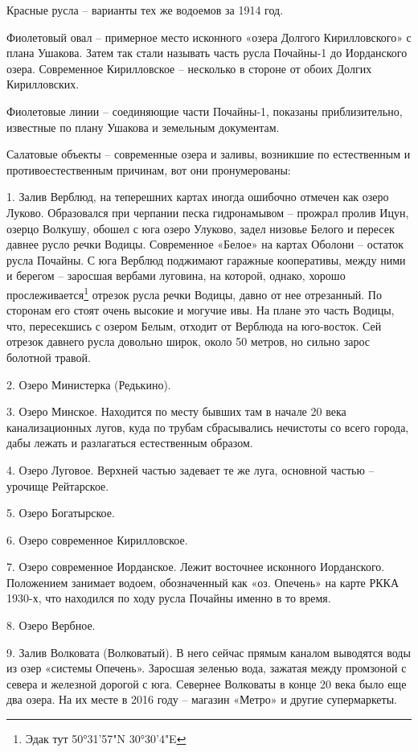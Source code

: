 Красные русла – варианты тех же водоемов за 1914 год.

Фиолетовый овал – примерное место исконного «озера Долгого Кирилловского» с плана Ушакова. Затем так стали называть часть русла Почайны-1 до Иорданского озера. Современное Кирилловское – несколько в стороне от обоих Долгих Кирилловских.

Фиолетовые линии – соединяющие части Почайны-1, показаны приблизительно, известные по плану Ушакова и земельным документам.

Салатовые объекты – современные озера и заливы, возникшие по естественным и противоестественным причинам, вот они пронумерованы:

1. Залив Верблюд, на теперешних картах иногда ошибочно отмечен как озеро Луково. Образовался при черпании песка гидронамывом – прожрал пролив Ицун, озерцо Волкушу, обошел с юга озеро Улуково, задел низовье Белого и пересек давнее русло речки Водицы. Современное «Белое» на картах Оболони – остаток русла Почайны. С юга Верблюд поджимают гаражные кооперативы, между ними и берегом – заросшая вербами луговина, на которой, однако, хорошо прослеживается\footnote{Эдак тут 50°31'57"N 30°30'4"E} отрезок русла речки Водицы, давно от нее отрезанный. По сторонам его стоят очень высокие и могучие ивы. На плане это часть Водицы, что, пересекшись с озером Белым, отходит от Верблюда на юго-восток. Сей отрезок давнего русла довольно широк, около 50 метров, но сильно зарос болотной травой.

2. Озеро Министерка (Редькино).

3. Озеро Минское. Находится по месту бывших там в начале 20 века канализационных лугов, куда по трубам сбрасывались нечистоты со всего города, дабы лежать и разлагаться естественным образом.

4. Озеро Луговое. Верхней частью задевает те же луга, основной частью – урочище Рейтарское.

5. Озеро Богатырское.

6. Озеро современное Кирилловское.

7. Озеро современное Иорданское. Лежит восточнее исконного Иорданского. Положением занимает водоем, обозначенный как «оз. Опечень» на карте РККА 1930-х, что находился по ходу русла Почайны именно в то время.

8. Озеро Вербное.

9. Залив Волковата (Волковатый). В него сейчас прямым каналом выводятся воды из озер «системы Опечень». Заросшая зеленью вода, зажатая между промзоной с севера и железной дорогой с юга. Севернее Волковаты в конце 20 века было еще два озера. На их месте в 2016 году – магазин «Метро» и другие супермаркеты.

